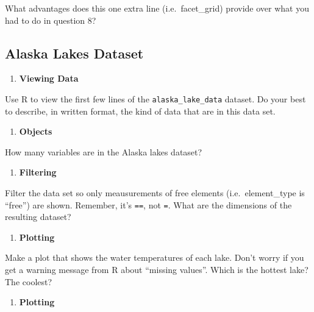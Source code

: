 \documentclass[
]{krantz}
\providecommand{\tightlist}{%
  \setlength{\itemsep}{0pt}\setlength{\parskip}{0pt}}
\begin{document}
What advantages does this one extra line (i.e.~facet\_grid) provide over what you had to do in question 8?

\hypertarget{alaska-lakes-dataset}{%
\subsection{Alaska Lakes Dataset}\label{alaska-lakes-dataset}}

\begin{enumerate}
\def\labelenumi{\arabic{enumi}.}
\tightlist
\item
  \textbf{Viewing Data}
\end{enumerate}

Use R to view the first few lines of the \texttt{alaska\_lake\_data} dataset. Do your best to describe, in written format, the kind of data that are in this data set.

\begin{enumerate}
\def\labelenumi{\arabic{enumi}.}
\setcounter{enumi}{1}
\tightlist
\item
  \textbf{Objects}
\end{enumerate}

How many variables are in the Alaska lakes dataset?

\begin{enumerate}
\def\labelenumi{\arabic{enumi}.}
\setcounter{enumi}{2}
\tightlist
\item
  \textbf{Filtering}
\end{enumerate}

Filter the data set so only meausurements of free elements (i.e.~element\_type is ``free'') are shown. Remember, it's \texttt{==}, not \texttt{=}. What are the dimensions of the resulting dataset?

\begin{enumerate}
\def\labelenumi{\arabic{enumi}.}
\setcounter{enumi}{3}
\tightlist
\item
  \textbf{Plotting}
\end{enumerate}

Make a plot that shows the water temperatures of each lake. Don't worry if you get a warning message from R about ``missing values''. Which is the hottest lake? The coolest?

\begin{enumerate}
\def\labelenumi{\arabic{enumi}.}
\setcounter{enumi}{4}
\tightlist
\item
  \textbf{Plotting}
\end{enumerate}
\end{document}
